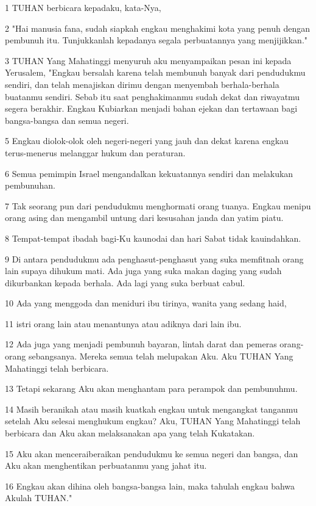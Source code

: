 \par 1 TUHAN berbicara kepadaku, kata-Nya,
\par 2 "Hai manusia fana, sudah siapkah engkau menghakimi kota yang penuh dengan pembunuh itu. Tunjukkanlah kepadanya segala perbuatannya yang menjijikkan."
\par 3 TUHAN Yang Mahatinggi menyuruh aku menyampaikan pesan ini kepada Yerusalem, "Engkau bersalah karena telah membunuh banyak dari pendudukmu sendiri, dan telah menajiskan dirimu dengan menyembah berhala-berhala buatanmu sendiri. Sebab itu saat penghakimanmu sudah dekat dan riwayatmu segera berakhir. Engkau Kubiarkan menjadi bahan ejekan dan tertawaan bagi bangsa-bangsa dan semua negeri.
\par 5 Engkau diolok-olok oleh negeri-negeri yang jauh dan dekat karena engkau terus-menerus melanggar hukum dan peraturan.
\par 6 Semua pemimpin Israel mengandalkan kekuatannya sendiri dan melakukan pembunuhan.
\par 7 Tak seorang pun dari pendudukmu menghormati orang tuanya. Engkau menipu orang asing dan mengambil untung dari kesusahan janda dan yatim piatu.
\par 8 Tempat-tempat ibadah bagi-Ku kaunodai dan hari Sabat tidak kauindahkan.
\par 9 Di antara pendudukmu ada penghasut-penghasut yang suka memfitnah orang lain supaya dihukum mati. Ada juga yang suka makan daging yang sudah dikurbankan kepada berhala. Ada lagi yang suka berbuat cabul.
\par 10 Ada yang menggoda dan meniduri ibu tirinya, wanita yang sedang haid,
\par 11 istri orang lain atau menantunya atau adiknya dari lain ibu.
\par 12 Ada juga yang menjadi pembunuh bayaran, lintah darat dan pemeras orang-orang sebangsanya. Mereka semua telah melupakan Aku. Aku TUHAN Yang Mahatinggi telah berbicara.
\par 13 Tetapi sekarang Aku akan menghantam para perampok dan pembunuhmu.
\par 14 Masih beranikah atau masih kuatkah engkau untuk mengangkat tanganmu setelah Aku selesai menghukum engkau? Aku, TUHAN Yang Mahatinggi telah berbicara dan Aku akan melaksanakan apa yang telah Kukatakan.
\par 15 Aku akan menceraiberaikan pendudukmu ke semua negeri dan bangsa, dan Aku akan menghentikan perbuatanmu yang jahat itu.
\par 16 Engkau akan dihina oleh bangsa-bangsa lain, maka tahulah engkau bahwa Akulah TUHAN."

